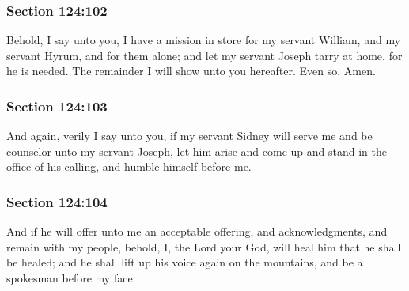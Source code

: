 	\subsubsection{Section 124:102} %
		\label{DC124-102}

		Behold, I say unto you, I have a mission in store for my servant William, and my servant Hyrum, and for them alone; and let my servant Joseph tarry at home, for he is needed.  The remainder I will show unto you hereafter.  Even so.  Amen.


	\subsubsection{Section 124:103} %
		\label{DC124-103}

		And again, verily I say unto you, if my servant Sidney will serve me and be counselor unto my servant Joseph, let him arise and come up and stand in the office of his calling, and humble himself before me.


	\subsubsection{Section 124:104} %
		\label{DC124-104}

		And if he will offer unto me an acceptable offering, and acknowledgments, and remain with my people, behold, I, the Lord your God, will heal him that he shall be healed; and he shall lift up his voice again on the mountains, and be a spokesman before my face.

